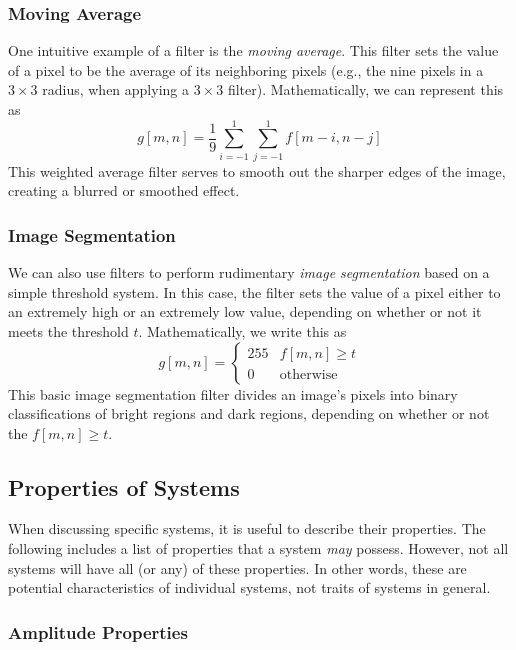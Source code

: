 \documentclass{article}
\begin{document}
\subsubsection*{Moving Average}
One intuitive example of a filter is the \emph{moving average}. This filter sets the value of a pixel to be the average of its neighboring pixels (e.g., the nine pixels in a $3 \times 3$ radius, when applying a $3 \times 3$ filter). Mathematically, we can represent this as
\[
	g[m, n] = \frac{1}{9} \sum\limits_{i = -1}^{1}\sum\limits_{j = -1}^{1} f[m - i, n - j] \tag{Weighted Average}
\]
This weighted average filter serves to smooth out the sharper edges of the image, creating a blurred or smoothed effect.

\subsubsection*{Image Segmentation}
We can also use filters to perform rudimentary \emph{image segmentation} based on a simple threshold system. In this case, the filter sets the value of a pixel either to an extremely high or an extremely low value, depending on whether or not it meets the threshold $t$. Mathematically, we write this as
\[
	g[m, n] = \begin{cases} 255 & f[m, n] \geq t \\ 0 & \text{otherwise}\end{cases} \tag{Threshold}
\]
This basic image segmentation filter divides an image's pixels into binary classifications of bright regions and dark regions, depending on whether or not the $f[m, n] \geq t$.

\subsection{Properties of Systems}

When discussing specific systems, it is useful to describe their properties. The following includes a list of properties that a system \emph{may} possess. However, not all systems will have all (or any) of these properties. In other words, these are potential characteristics of individual systems, not traits of systems in general.

\subsubsection*{Amplitude Properties}
\end{document}

